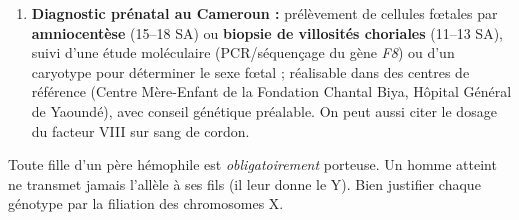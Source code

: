 \documentclass[11pt]{article}
\begin{document}
\begin{corrige}
\begin{enumerate}
    \item \textbf{Diagnostic prénatal au Cameroun :} prélèvement de cellules fœtales par \textbf{amniocentèse} (15--18 SA) ou \textbf{biopsie de villosités choriales} (11--13 SA), suivi d'une étude moléculaire (PCR/séquençage du gène \emph{F8}) ou d'un caryotype pour déterminer le sexe fœtal ; réalisable dans des centres de référence (Centre Mère-Enfant de la Fondation Chantal Biya, Hôpital Général de Yaoundé), avec conseil génétique préalable. On peut aussi citer le dosage du facteur VIII sur sang de cordon.
\end{enumerate}
\end{corrige}

\begin{attention}
Toute fille d'un père hémophile est \emph{obligatoirement} porteuse. Un homme atteint ne transmet jamais l'allèle à ses fils (il leur donne le Y). Bien justifier chaque génotype par la filiation des chromosomes X.
\end{attention}
\end{document}
